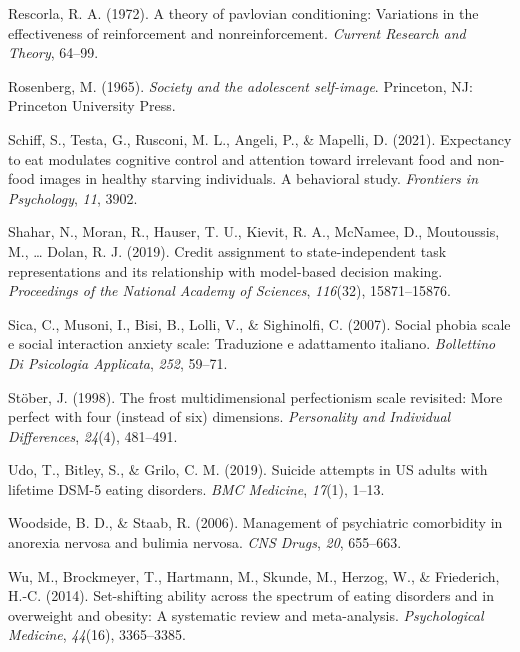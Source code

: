 \documentclass[
  man,floatsintext]{apa6}
\newlength{\cslhangindent}
\newlength{\cslentryspacingunit} %
\newenvironment{CSLReferences}[2] %
 {%
  \setlength{\parindent}{0pt}
  \ifodd #1
  \let\oldpar\par
  \def\par{\hangindent=\cslhangindent\oldpar}
  \fi
  \setlength{\parskip}{#2\cslentryspacingunit}
 }%
 {}
\begin{document}
\begin{CSLReferences}{1}{0}
\leavevmode{}%
Rescorla, R. A. (1972). A theory of pavlovian conditioning: Variations in the effectiveness of reinforcement and nonreinforcement. \emph{Current Research and Theory}, 64--99.

\leavevmode{}%
Rosenberg, M. (1965). \emph{Society and the adolescent self-image}. Princeton, NJ: Princeton University Press.

\leavevmode{}%
Schiff, S., Testa, G., Rusconi, M. L., Angeli, P., \& Mapelli, D. (2021). Expectancy to eat modulates cognitive control and attention toward irrelevant food and non-food images in healthy starving individuals. A behavioral study. \emph{Frontiers in Psychology}, \emph{11}, 3902.

\leavevmode{}%
Shahar, N., Moran, R., Hauser, T. U., Kievit, R. A., McNamee, D., Moutoussis, M., \ldots{} Dolan, R. J. (2019). Credit assignment to state-independent task representations and its relationship with model-based decision making. \emph{Proceedings of the National Academy of Sciences}, \emph{116}(32), 15871--15876.

\leavevmode{}%
Sica, C., Musoni, I., Bisi, B., Lolli, V., \& Sighinolfi, C. (2007). Social phobia scale e social interaction anxiety scale: Traduzione e adattamento italiano. \emph{Bollettino Di Psicologia Applicata}, \emph{252}, 59--71.

\leavevmode{}%
Stöber, J. (1998). The frost multidimensional perfectionism scale revisited: More perfect with four (instead of six) dimensions. \emph{Personality and Individual Differences}, \emph{24}(4), 481--491.

\leavevmode{}%
Udo, T., Bitley, S., \& Grilo, C. M. (2019). Suicide attempts in US adults with lifetime DSM-5 eating disorders. \emph{BMC Medicine}, \emph{17}(1), 1--13.

\leavevmode{}%
Woodside, B. D., \& Staab, R. (2006). Management of psychiatric comorbidity in anorexia nervosa and bulimia nervosa. \emph{CNS Drugs}, \emph{20}, 655--663.

\leavevmode{}%
Wu, M., Brockmeyer, T., Hartmann, M., Skunde, M., Herzog, W., \& Friederich, H.-C. (2014). Set-shifting ability across the spectrum of eating disorders and in overweight and obesity: A systematic review and meta-analysis. \emph{Psychological Medicine}, \emph{44}(16), 3365--3385.

\end{CSLReferences}
\end{document}
